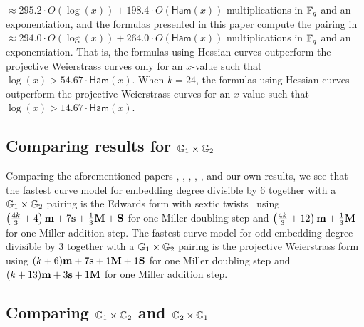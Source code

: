 $\approx 295.2 \cdot O(\log(x)) + 198.4 \cdot O(\mathsf{Ham}(x))$
multiplications in $\mathbb{F}_{q}$ and an exponentiation,
and the formulas presented in this paper compute the pairing in
$\approx 294.0 \cdot O(\log(x)) + 264.0 \cdot O(\mathsf{Ham}(x))$
multiplications in $\mathbb{F}_{q}$ and an exponentiation.
That is, the formulas using Hessian curves outperform the projective Weierstrass curves 
only for an $x$-value such that $\log(x) > 54.67 \cdot \mathsf{Ham}(x)$.
%
When $k = 24$, 
the formulas using Hessian curves outperform the projective Weierstrass curves for an $x$-value such that $\log(x) > 14.67 \cdot \mathsf{Ham}(x)$.

\subsection{Comparing results for $\mathbb{G}_{1} \times \mathbb{G}_{2}$}

Comparing the aforementioned papers \cite{2008/IonicaJoux08}, \cite{2009/fastertate}, \cite{2009/craig}, \cite{2014/LWZ}, \cite{2010/Gu},
and our own results, we see that the fastest curve model for embedding degree divisible by 6 together with a $\mathbb{G}_{1} \times \mathbb{G}_{2}$ pairing
is the Edwards form with sextic twists~\cite{2014/LWZ}
using
$\left(\frac{4k}{3}+ 4\right)\textbf{m} + 7\textbf{s}  + \frac{1}{3}\textbf{M} + \textbf{S}$
for one Miller doubling step and
$\left(\frac{4k}{3} + 12\right)\textbf{m}  + \frac{1}{3}\textbf{M}$
for one Miller addition step.
The fastest curve model for odd embedding degree divisible by 3 together with a $\mathbb{G}_{1} \times \mathbb{G}_{2}$ pairing
is the projective Weierstrass form~\cite{2009/craig}
using
$(k+6)\textbf{m} + 7\textbf{s} + 1\textbf{M} + 1\textbf{S}$
for one Miller doubling step and
$(k+13)\textbf{m} + 3\textbf{s} + 1\textbf{M}$
for one Miller addition step.


\subsection{Comparing $\mathbb{G}_{1} \times \mathbb{G}_{2}$ and $\mathbb{G}_{2} \times \mathbb{G}_{1}$}

